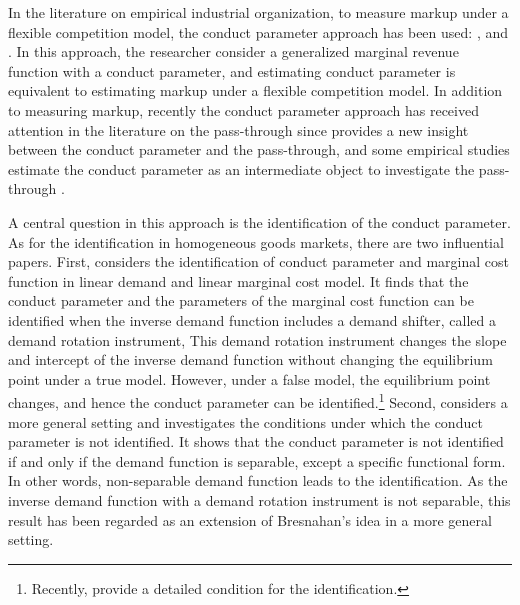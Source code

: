 \documentclass[11pt, a4paper]{article}
\theoremstyle{remark}
\begin{document}
In the literature on empirical industrial organization, to measure markup under a flexible competition model, the conduct parameter approach has been used: \citet{porterStudy1983}, \citet{genesoveTesting1998} and \citet{okazakiExcess2022}.
In this approach, the researcher consider a generalized marginal revenue function with a conduct parameter, and estimating conduct parameter is equivalent to estimating markup under a flexible competition model.
In addition to measuring markup, recently the conduct parameter approach has received attention in the literature on the pass-through since \citet{weylPassThrough2013} provides a new insight between the conduct parameter and the pass-through, and some empirical studies estimate the conduct parameter as an intermediate object to investigate the pass-through \citep{millerPassthrough2017}.

A central question in this approach is the identification of the conduct parameter.
As for the identification in homogeneous goods markets, there are two influential papers.
First, \citet{bresnahanOligopoly1982} considers the identification of conduct parameter and marginal cost function in linear demand and linear marginal cost model.
It finds that the conduct parameter and the parameters of the marginal cost function can be identified when the inverse demand function includes a demand shifter, called a demand rotation instrument, 
This demand rotation instrument changes the slope and intercept of the inverse demand function without changing the equilibrium point under a true model.
However, under a false model, the equilibrium point changes, and hence the conduct parameter can be identified.\footnote{Recently, \citet{matsumuraResolving2023} provide a detailed condition for the identification.}
Second, \citet{lauIdentifying1982} considers a more general setting and investigates the conditions under which the conduct parameter is not identified.
It shows that the conduct parameter is not identified if and only if the demand function is separable, except a specific functional form.
In other words, non-separable demand function leads to the identification.
As the inverse demand function with a demand rotation instrument is not separable, this result has been regarded as an extension of Bresnahan's idea in a more general setting.
\end{document}
